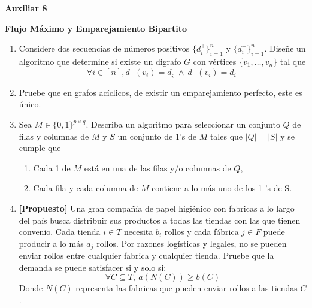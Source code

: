 

\header
\begin{center}
	\LARGE \bf{Auxiliar 8}
\end{center}

\begin{center}
	\bf{Flujo Máximo y Emparejamiento Bipartito}\\
\end{center}

\begin{enumerate}[label ={\bf P\arabic*}]
	\item Considere dos secuencias de números positivos $\{d_i^{+}\}_{i=1}^n$ y $\{d_i^{-}\}_{i=1}^n$. Diseñe un algoritmo que determine si existe un digrafo $G$ con vértices $\{v_1, \ldots, v_n\}$ tal que
	\[\forall i \in[n], d^{+}(v_i)=d_i^{+} \land \: d^{-}(v_i)=d_i^{-}\]

	\item Pruebe que en grafos acíclicos, de existir un emparejamiento perfecto, este es único.
	
	\item Sea $M \in\{0,1\}^{p \times q}$. Describa un algoritmo para seleccionar un conjunto $Q$ de filas y columnas de $M$ y $S$ un conjunto de 1's de $M$ tales que $|Q|=|S|$ y se cumple que
	\begin{enumerate}
		\item Cada 1 de $M$ está en una de las filas y/o columnas de $Q$,
		\item Cada fila y cada columna de $M$ contiene a lo más uno de los 1 's de S.
	\end{enumerate}
	
	\item \textbf{[Propuesto]} Una gran compañía de papel higiénico con fabricas a lo largo del país busca distribuir sus productos a todas las tiendas con las que tienen convenio. Cada tienda $i \in T$ necesita $b_i$ rollos y cada fábrica $j \in F$ puede producir a lo más $a_j$ rollos. Por razones logísticas y legales, no se pueden enviar rollos entre cualquier fabrica y cualquier tienda. Pruebe que la demanda se puede satisfacer si y solo si:
	\[\forall C \subseteq T, \: a(N(C)) \geq b(C)\]
	Donde $N(C)$ representa las fabricas que pueden enviar rollos a las tiendas $C$.
	

\end{enumerate}
